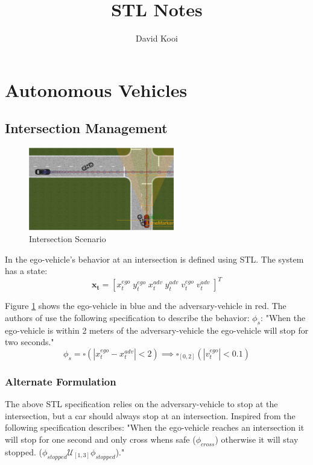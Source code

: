 \documentclass{article}
\title{STL Notes}
\author{David Kooi}
\theoremstyle{definition}
\begin{document}
\maketitle

\section{Autonomous Vehicles}
\subsection{Intersection Management}

\begin{figure}[H] 
\centering
\includegraphics[width=2.5in]{Figures/raman_2015_intersection.png}
\caption{Intersection Scenario}
\label{fig:raman_intersection}
\end{figure}

In \cite{raman_reactive_2015} the ego-vehicle's behavior at an intersection is defined using STL. The system has a state: 
\begin{equation}
    \mathbf{x_t} = [x_{t}^{ego}\; y_{t}^{ego}\; x_{t}^{adv}\; y_{t}^{adv}\; v_{t}^{ego}\; v_{t}^{adv}\;]^T
\end{equation}

Figure \ref{fig:raman_intersection} shows the ego-vehicle in blue and the adversary-vehicle in red. The authors of \cite{raman_reactive_2015} use the following specification to describe the behavior: $\phi_s$: "When the ego-vehicle is within 2 meters of the adversary-vehicle the ego-vehicle will stop for two seconds."
\begin{equation}
    \phi_s = \square(|x_{t}^{ego} - x_{t}^{adv}| < 2) \implies \square_{[0,2]}(|v_{t}^{ego}|<0.1)
\end{equation}

\subsubsection{Alternate Formulation}
The above STL specification relies on the adversary-vehicle to stop at the intersection, but a car should always stop at an intersection. Inspired from \cite{chen_signal_nodate} the following specification describes: "When the ego-vehicle reaches an intersection it will stop for one second and only cross whens safe ($\phi_{cross}$) otherwise it will stay stopped. ($\phi_{stopped}\mathcal{U}_{[1,3]}\phi_{stopped}$)."
\end{document}
